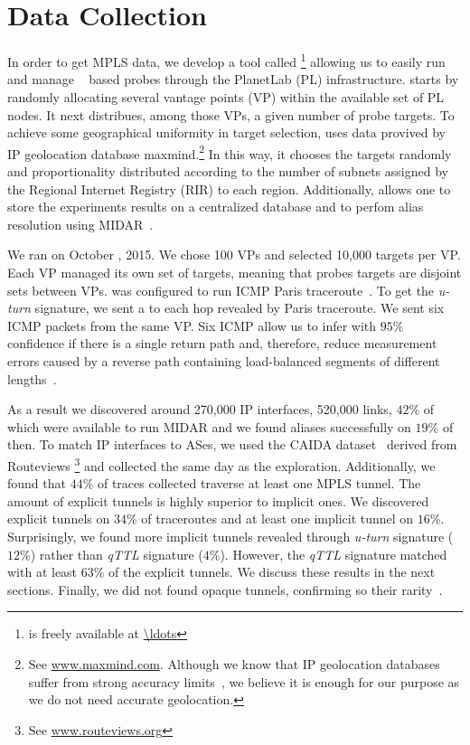 \section{Data Collection}\label{dataset}
In order to get MPLS data, we develop a tool called
\magallanes\footnote{\magallanes is freely available at \url{\ldots}} allowing
us to easily run and manage \scamper~\cite{Luckie10} based probes through the
PlanetLab (PL) infrastructure.  \magallanes starts by randomly allocating
several vantage points (VP) within the available set of PL nodes.  It next
distribues, among those VPs, a given number of probe targets.
To achieve some geographical uniformity in target selection, \magallanes uses
data provived by IP geolocation database maxmind.\footnote{See
\url{www.maxmind.com}.  Although we know that IP geolocation databases suffer
from strong accuracy limits~\cite{geolocation}, we believe it is enough for our
purpose as we do not need accurate geolocation.}  In this way, it chooses the
targets randomly and proportionality distributed according to the number of
subnets assigned by the Regional Internet Registry (RIR) to each region.
Additionally, \magallanes allows one to store the experiments results on a
centralized database and to perfom alias resolution using MIDAR~\cite{Keys13}.

We ran \magallanes on October , 2015.  We chose 100 VPs and selected
10,000 targets per VP.  Each VP managed its own set of targets, meaning that
probes targets are disjoint sets between VPs.  \scamper was configured to run
ICMP Paris traceroute~\cite{BRICE06}.  To get the \textit{u-turn} signature,
we sent a \ping to each hop revealed by Paris traceroute. We sent six
ICMP \echorequest packets from the same VP.  Six ICMP \echoreply allow us to
infer with $95\%$ confidence if there is a single return path and, 
therefore, reduce measurement errors caused by a reverse path containing
load-balanced segments of different lengths~\cite{BRICE07}. 

As a result we discovered around 270,000 IP interfaces,  520,000 links, $42\%$
of which were available to run MIDAR and we found aliases successfully on $19\%$
of then. To match IP interfaces to ASes, we used the CAIDA
dataset~\cite{caida_ref} derived from Routeviews \footnote{See
\url{www.routeviews.org}} and collected the same day as the exploration.
Additionally, we found that $44\%$ of traces collected traverse at least one
MPLS tunnel.  The amount of explicit tunnels is highly superior to implicit
ones. We discovered explicit tunnels on $34\%$ of traceroutes and at least one
implicit tunnel on $16\%$. Surprisingly, we found more implicit tunnels revealed
through \textit{u-turn} signature ($12\%$) rather than \textit{qTTL} signature
($4\%$). However, the \textit{qTTL} signature matched with at least $63\%$ of
the explicit tunnels. We discuss these results in the next sections. Finally, we
did not found opaque tunnels, confirming so their rarity~\cite{VAN2013}.

